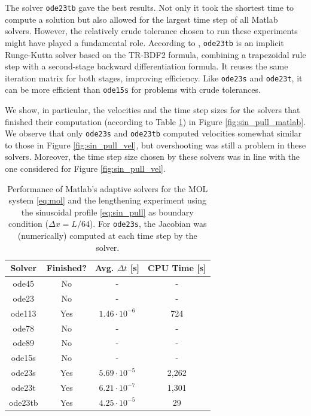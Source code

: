\documentclass{sfuthesis}
\numberwithin{equation}{section}
\numberwithin{figure}{chapter}
\numberwithin{table}{chapter}
\theoremstyle{definition}
\begin{document}
The solver \texttt{ode23tb} gave the best results. Not only it took
the shortest time to compute a solution but also allowed for the largest time step of all Matlab solvers. However, the relatively crude tolerance chosen to run these experiments might have played a fundamental role. According to \cite{ShampineReichelt1997}, \texttt{ode23tb} is an implicit Runge-Kutta solver based on the TR-BDF2 formula, combining a trapezoidal rule step with a second-stage backward differentiation formula. It reuses the same iteration matrix for both stages, improving efficiency. Like \texttt{ode23s} and \texttt{ode23t}, it can be more efficient than \texttt{ode15s} for problems with crude tolerances.

We show, in particular, the velocities and the time step sizes for the solvers that finished their computation (according to Table \ref{tab:mol_matlab_solvers}) in Figure \ref{fig:sin_pull_matlab}. We observe that only \texttt{ode23s} and \texttt{ode23tb} computed velocities somewhat similar to those in Figure \ref{fig:sin_pull_vel}, but overshooting was still a problem in these solvers. Moreover, the time step size chosen by these solvers was in line with the one considered for Figure \ref{fig:sin_pull_vel}.

\begin{table}
	\centering
	\begin{tabular}{|c|c|c|c|}\hline
		Solver & Finished? & Avg. $\Delta t$ [s] & CPU Time [s] \\\hline
		ode45 & No & - & -  \\\hline
		ode23 & No & - & -  \\\hline
		ode113 & Yes & $1.46 \cdot 10^{-6}$ & 724  \\\hline
		ode78 & No & - & -   \\\hline
		ode89 & No & - & -   \\\hline
		ode15s & No & - & -  \\\hline
		ode23s & Yes & $5.69 \cdot 10^{-5}$ & 2,262 \\\hline
		ode23t & Yes & $6.21 \cdot 10^{-7}$ & 1,301 \\\hline
		ode23tb & Yes & $4.25 \cdot 10^{-5}$ & 29  \\\hline
	\end{tabular}
	\caption{Performance of Matlab's adaptive solvers for the MOL system \eqref{eq:mol} and the lengthening experiment using the sinusoidal profile \eqref{eq:sin_pull} as boundary condition ($\Delta x = L/64$). For \texttt{ode23s}, the Jacobian was (numerically) computed at each time step by the solver. \label{tab:mol_matlab_solvers}}
\end{table}
\end{document}
